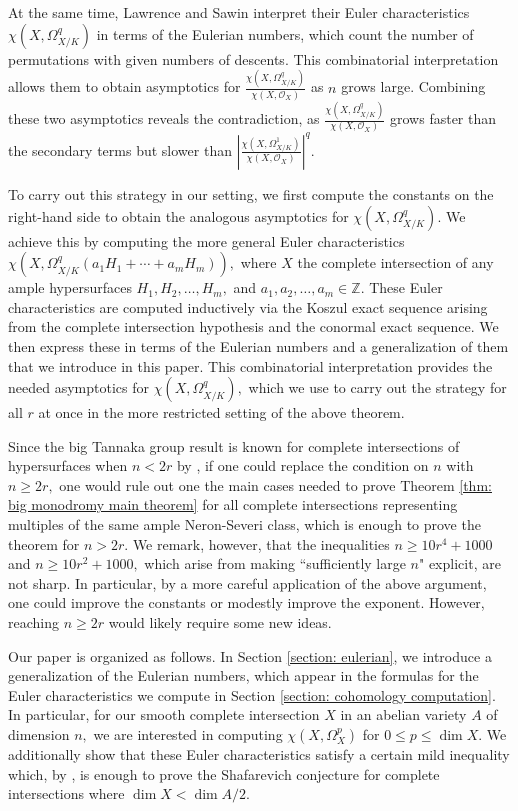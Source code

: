 \documentclass{article}
\theoremstyle{definition}
\theoremstyle{remark}
\begin{document}
\par At the same time, Lawrence and Sawin interpret their Euler characteristics $\chi(X, \Omega^q_{X/K})$ in terms of the Eulerian numbers, which count the number of permutations with given numbers of descents. This combinatorial interpretation allows them to obtain asymptotics for $\frac{\chi(X, \Omega^q_{X/K})}{\chi(X, \mathcal{O}_X)}$ as $n$ grows large. Combining these two asymptotics reveals the contradiction, as $\frac{\chi(X, \Omega^q_{X/K})}{\chi(X, \mathcal{O}_X)}$ grows faster than the secondary terms but slower than $\left|\frac{\chi(X, \Omega^1_{X/K})}{\chi(X, \mathcal{O}_X)}\right|^q.$
\par To carry out this strategy in our setting, we first compute the constants on the right-hand side to obtain the analogous asymptotics for $\chi(X, \Omega^q_{X/K}).$ We achieve this by computing the more general Euler characteristics $\chi(X, \Omega^q_{X/K}(a_1H_1 + \cdots + a_mH_m)),$ where $X$ the complete intersection of any ample hypersurfaces $H_1, H_2, \ldots, H_m,$ and $a_1, a_2, \ldots, a_m \in \mathbb{Z}.$ These Euler characteristics are computed inductively via the Koszul exact sequence arising from the complete intersection hypothesis and the conormal exact sequence. We then express these in terms of the Eulerian numbers and a generalization of them that we introduce in this paper. This combinatorial interpretation provides the needed asymptotics for $\chi(X, \Omega^q_{X/K}),$ which we use to carry out the strategy for all $r$ at once in the more restricted setting of the above theorem. 
\par Since the big Tannaka group result is known for complete intersections of hypersurfaces when $n < 2r$ by \cite{jklm23}, if one could replace the condition on $n$ with $n \geq 2r,$ one would rule out one the main cases needed to prove Theorem \ref{thm: big monodromy main theorem} for all complete intersections representing multiples of the same ample Neron-Severi class, which is enough to prove the theorem for $n > 2r.$ We remark, however, that the inequalities $n \geq 10r^4 + 1000$ and $n \geq 10r^2 + 1000,$ which arise from making ``sufficiently large $n$" explicit, are not sharp. In particular, by a more careful application of the above argument, one could improve the constants or modestly improve the exponent. However, reaching $n \geq 2r$ would likely require some new ideas.
\par Our paper is organized as follows. In Section \ref{section: eulerian}, we introduce a generalization of the Eulerian numbers, which appear in the formulas for the Euler characteristics we compute in Section \ref{section: cohomology computation}. In particular, for our smooth complete intersection $X$ in an abelian variety $A$ of dimension $n,$ we are interested in computing $\chi(X, \Omega^p_X)$ for $0 \leq p \leq \dim X.$ We additionally show that these Euler characteristics satisfy a certain mild inequality which, by \cite{km24}, is enough to prove the Shafarevich conjecture for complete intersections where $\dim X < \dim A/2.$
\end{document}
